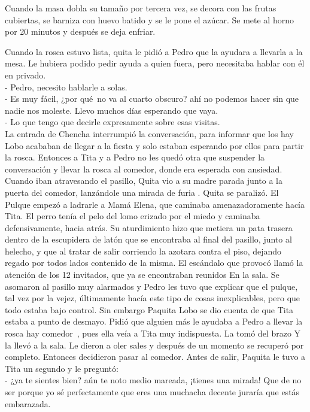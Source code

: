 Cuando la masa dobla su tamaño por tercera vez, se decora con las
frutas cubiertas, se barniza con huevo batido y se le pone el azúcar. Se
mete al horno por 20 minutos y después se deja enfriar.

Cuando la rosca estuvo lista, quita le pidió a Pedro que la ayudara a
llevarla a la mesa. Le hubiera podido pedir ayuda a quien fuera, pero
necesitaba hablar con él en privado.
\\- Pedro, necesito hablarle a solas. %
\\- Es muy fácil, ¿por qué~no va al cuarto obscuro? ahí no podemos %
hacer sin que nadie nos moleste. Llevo muchos días esperando que vaya. %
\\- Lo que tengo que decirle expresamente sobre esas visitas.\\



La entrada de Chencha interrumpió la conversación, para informar que los
hay Lobo acababan de llegar a la fiesta y solo estaban esperando por
ellos para partir la rosca. Entonces a Tita y a Pedro no les quedó otra
que suspender la conversación y llevar la rosca al comedor, donde era
esperada con ansiedad. Cuando iban atravesando el pasillo, Quita vio a
su madre parada junto a la puerta del comedor, lanzándole una mirada de
furia . Quita se paralizó. El Pulque empezó a ladrarle a Mamá Elena, que
caminaba amenazadoramente hacía Tita. El perro tenía el pelo del lomo
erizado por el miedo y caminaba defensivamente, hacia atrás. Su
aturdimiento hizo que metiera un pata trasera dentro de la escupidera de
latón que se encontraba al final del pasillo, junto al helecho, y que al
tratar de salir corriendo la azotara contra el piso, dejando regado por
todos lados contenido de la misma.
El escándalo que provocó llamó la atención de los 12 invitados, que ya
se encontraban reunidos En la sala. Se asomaron al pasillo muy alarmados
y Pedro les tuvo que explicar que el pulque, tal vez por la vejez,
últimamente hacía este tipo de cosas inexplicables, pero que todo estaba
bajo control. Sin embargo Paquita Lobo se dio cuenta de que Tita estaba
a punto de desmayo. Pidió que alguien más le ayudaba a Pedro a llevar la
rosca hay comedor~, pues ella veía a Tita muy indispuesta. La tomó
del brazo Y la llevó a la sala. Le dieron a oler sales y después de un
momento se recuperó por completo. Entonces decidieron pasar al comedor.
Antes de salir, Paquita le tuvo a Tita un segundo y le preguntó:
\\- ¿ya te sientes bien? aún te noto medio mareada, ¡tienes una mirada! %
Que de no ser porque yo sé perfectamente que eres una muchacha decente %
juraría que estás embarazada.\\

